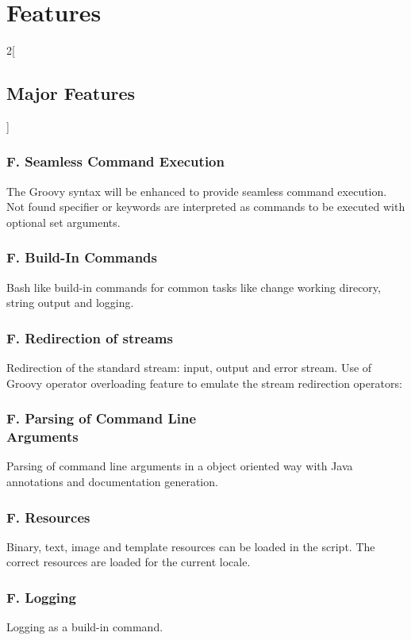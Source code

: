 \section{Features}

\begin{multicols}{2}[\subsection{Major Features}]
 
\subsubsection*{F\printTheFeature. Seamless Command Execution}

The Groovy syntax will be enhanced to provide seamless command execution.
Not found specifier or keywords are interpreted as commands to be executed with
optional set arguments.

\subsubsection*{F\printTheFeature. Build-In Commands}

Bash like build-in commands for common tasks like change working direcory,
string output and logging.

\subsubsection*{F\printTheFeature. Redirection of streams}

Redirection of the standard stream: input, output and error stream.
Use of Groovy operator overloading feature to emulate the stream redirection
operators: 

\subsubsection*{F\printTheFeature. Parsing of Command Line\\Arguments}

Parsing of command line arguments in a object oriented way with Java
annotations and documentation generation.

\subsubsection*{F\printTheFeature. Resources}

Binary, text, image and template resources can be loaded in the script.
The correct resources are loaded for the current locale.

\subsubsection*{F\printTheFeature. Logging}

Logging as a build-in command.

\end{multicols}
